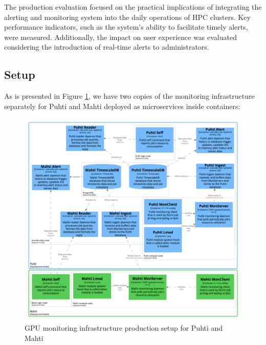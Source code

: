 
The production evaluation focused on the practical implications of integrating the alerting and monitoring system into the daily operations of HPC clusters. Key performance indicators, such as the system's ability to facilitate timely alerts, were measured. Additionally, the impact on user experience was evaluated considering the introduction of real-time alerts to administrators.

\subsection{Setup}

As is presented in Figure \ref{fig_monitoring_production_development}, we have two copies of the monitoring infrastructure separately for Puhti and Mahti deployed as microservices inside containers:

\begin{figure}[H]
    \centering
    \includegraphics[width=1\textwidth]{figures/structurizr-1-ProductionDeployment.png}
    \caption{GPU monitoring infrastructure production setup for Puhti and Mahti}
    \label{fig_monitoring_production_development}
\end{figure}

